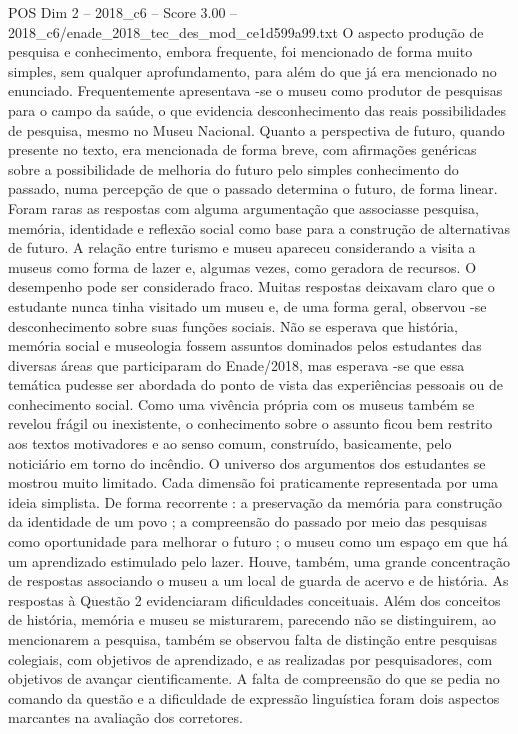 \begin{textsample}{POS Dim 2 – 2018\_c6 – Score 3.00 – 2018\_c6/enade\_2018\_tec\_des\_mod\_ce1d599a99.txt}
O aspecto produção de pesquisa e conhecimento, embora frequente, foi mencionado de forma muito simples, sem qualquer aprofundamento, para além do que já era mencionado no enunciado.
Frequentemente apresentava -se o museu como produtor de pesquisas para o campo da saúde, o que evidencia desconhecimento das reais possibilidades de pesquisa, mesmo no Museu Nacional.
Quanto a perspectiva de futuro, quando presente no texto, era mencionada de forma breve, com afirmações genéricas sobre a possibilidade de melhoria do futuro pelo simples conhecimento do passado, numa percepção de que o passado determina o futuro, de forma linear.
Foram raras as respostas com alguma argumentação que associasse pesquisa, memória, identidade e reflexão social como base para a construção de alternativas de futuro.
A relação entre turismo e museu apareceu considerando a visita a museus como forma de lazer e, algumas vezes, como geradora de recursos.
O desempenho pode ser considerado fraco.
Muitas respostas deixavam claro que o estudante nunca tinha visitado um museu e, de uma forma geral, observou -se desconhecimento sobre suas funções sociais.
Não se esperava que história, memória social e museologia fossem assuntos dominados pelos estudantes das diversas áreas que participaram do Enade/2018, mas esperava -se que essa temática pudesse ser abordada do ponto de vista das experiências pessoais ou de conhecimento social.
Como uma vivência própria com os museus também se revelou frágil ou inexistente, o conhecimento sobre o assunto ficou bem restrito aos textos motivadores e ao senso comum, construído, basicamente, pelo noticiário em torno do incêndio.
O universo dos argumentos dos estudantes se mostrou muito limitado.
Cada dimensão foi praticamente representada por uma ideia simplista.
De forma recorrente : a preservação da memória para construção da identidade de um povo ; a compreensão do passado por meio das pesquisas como oportunidade para melhorar o futuro ; o museu como um espaço em que há um aprendizado estimulado pelo lazer.
Houve, também, uma grande concentração de respostas associando o museu a um local de guarda de acervo e de história.
As respostas à Questão 2 evidenciaram dificuldades conceituais.
Além dos conceitos de história, memória e museu se misturarem, parecendo não se distinguirem, ao mencionarem a pesquisa, também se observou falta de distinção entre pesquisas colegiais, com objetivos de aprendizado, e as realizadas por pesquisadores, com objetivos de avançar cientificamente.
A falta de compreensão do que se pedia no comando da questão e a dificuldade de expressão linguística foram dois aspectos marcantes na avaliação dos corretores.

\end{textsample}
